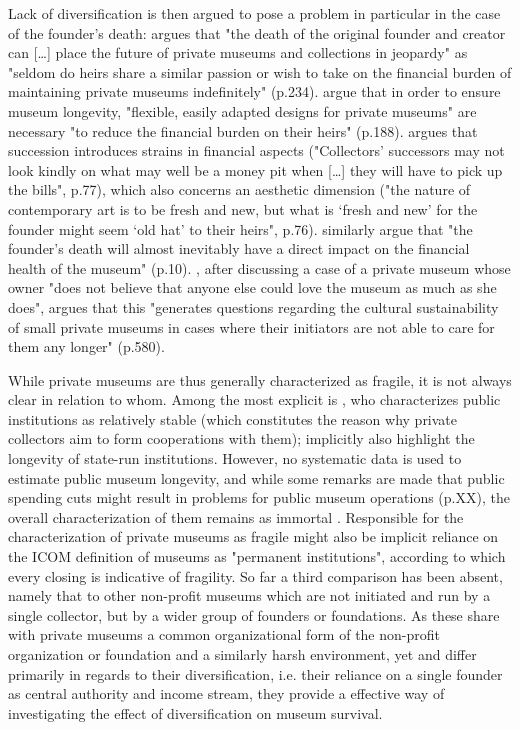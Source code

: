 \documentclass[12pt]{article}
\begin{document}
Lack of diversification is then argued to pose a problem in particular in the case of the founder's death:
\textcite{Walker_2019_collector} argues that "the death of the original founder and creator can [\ldots{}] place the future of private museums and collections in jeopardy" as "seldom do heirs share a similar passion or wish to take on the financial burden of maintaining private museums indefinitely" (p.234). 
\textcite{Bechtler_Imhof_2018_future} argue that in order to ensure museum longevity, "flexible, easily adapted designs for private museums" are necessary "to reduce the financial burden on their heirs" (p.188).
\textcite{Adam_2021_rise} argues that succession introduces strains in financial aspects ("Collectors’ successors may not look kindly on what may well be a money pit when [\ldots{}] they will have to pick up the bills", p.77), which also concerns an aesthetic dimension ("the nature of contemporary art is to be fresh and new, but what is ‘fresh and new’ for the founder might seem ‘old hat’ to their heirs", p.76).
\textcite{Velthuis_Gera_2024_fragility} similarly argue that "the founder’s death will almost inevitably have a direct impact on the financial health of the museum" (p.10).
\cite{StylianouLambert_etal_2014_museums}, after discussing a case of a private museum whose owner "does not believe that anyone else could love the museum as much as she does", argues that this "generates questions regarding the cultural sustainability of small private museums in cases where their initiators are not able to care for them any longer" (p.580).


While private museums are thus generally characterized as fragile, it is not always clear in relation to whom.
Among the most explicit is \textcite{Walker_2019_collector}, who characterizes public institutions as relatively stable (which constitutes the reason why private collectors aim to form cooperations with them); \textcite{Bechtler_Imhof_2018_future} implicitly also highlight the longevity of state-run institutions.
However, no systematic data is used to estimate public museum longevity, and while some
remarks are made that public spending cuts might result in problems for public museum operations (p.XX), the overall characterization of them remains as immortal \parencite{Frey_Meier_2002_beyeler}.
Responsible for the characterization of private museums as fragile might also be implicit reliance on the ICOM definition \parencite{ICOM_2024_definition} of museums as "permanent institutions", according to which every closing is indicative of fragility.
So far a third comparison has been absent, namely that to other non-profit museums which are not initiated and run by a single collector, but by a wider group of founders or foundations.
As these share with private museums a common organizational form of the non-profit organization or foundation  and a similarly harsh environment, yet and differ primarily in regards to their diversification, i.e. their reliance on a single founder as central authority and income stream, they provide a effective way of investigating the effect of diversification on museum survival. 
\end{document}
